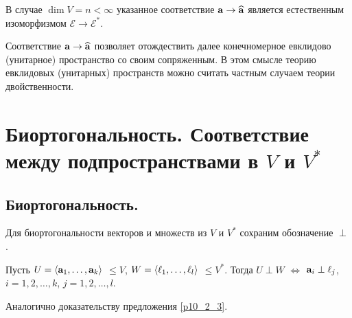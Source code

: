 \begin{sled}\label{s8_56}
В случае $\dim V = n<\infty$ указанное соответствие $\mathbf{a}\to \widehat{\mathbf{a}}$ является естественным изоморфизмом
$\mathcal{E}\to \mathcal{E}^{*}$.
\end{sled}

Соответствие $\mathbf{a}\to \widehat{\mathbf{a}}$ позволяет отождествить далее конечномерное евклидово (унитарное) 
пространство со своим сопряженным. 
В этом смысле теорию евклидовых (унитарных) пространств можно считать частным случаем 
теории двойственности.



\section{Биортогональность. Соответствие между подпространствами в $V$ и $V^*$}

\subsection{Биортогональность. }


Для биортогональности векторов и множеств из $V$ и $V^*$ сохраним обозначение $\perp$.


\begin{predl}\label{p10_2_3} 
Пусть $U= \langle \mathbf{a}_1, \ldots, \mathbf{a}_k \rangle$ $\leq V$, $W= \langle \ell_1, \ldots, \ell_l \rangle$ $\leq V^*$.
Тогда  $U \perp W$
$\Leftrightarrow$ $\mathbf{a}_i\perp \ell_j$, $i=1, 2, \ldots, k$, $j=1, 2, \ldots, l$.
\end{predl}
\dok Аналогично доказательству предложения \ref{p10_2_3}.
\edok




